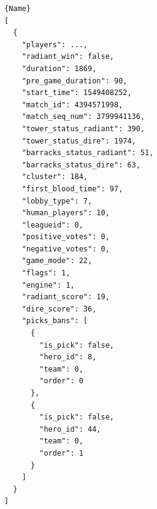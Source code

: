 \documentclass[
12pt,				%
openright,			%
oneside,			%
a4paper,			%
english,			%
brazil,				%
]{abntex2}
\begin{document}

\begin{center}
\begin{minipage}{.5\textwidth}
\begin{lstlisting}[caption=match]{Name}
[
  {
    "players": ...,
    "radiant_win": false,
    "duration": 1869,
    "pre_game_duration": 90,
    "start_time": 1549408252,
    "match_id": 4394571998,
    "match_seq_num": 3799941136,
    "tower_status_radiant": 390,
    "tower_status_dire": 1974,
    "barracks_status_radiant": 51,
    "barracks_status_dire": 63,
    "cluster": 184,
    "first_blood_time": 97,
    "lobby_type": 7,
    "human_players": 10,
    "leagueid": 0,
    "positive_votes": 0,
    "negative_votes": 0,
    "game_mode": 22,
    "flags": 1,
    "engine": 1,
    "radiant_score": 19,
    "dire_score": 36,
    "picks_bans": [
      {
        "is_pick": false,
        "hero_id": 8,
        "team": 0,
        "order": 0
      },
      {
        "is_pick": false,
        "hero_id": 44,
        "team": 0,
        "order": 1
      }
    ]
  }
]
\end{lstlisting}
\end{minipage}
\end{center}
\end{document}
